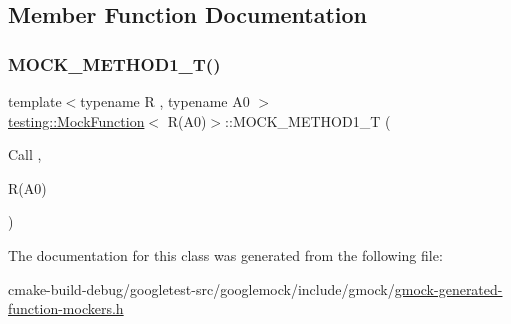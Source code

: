 \subsection{Member Function Documentation}
\mbox{\label{classtesting_1_1MockFunction_3_01R_07A0_08_4_a6a22e7e14b53d2df30bef4404b41fade}} 
\subsubsection{\texorpdfstring{MOCK\_METHOD1\_T()}{MOCK\_METHOD1\_T()}}
{\footnotesize\ttfamily template$<$typename R , typename A0 $>$ \\
\mbox{\hyperlink{classtesting_1_1MockFunction}{testing\+::\+Mock\+Function}}$<$ R(A0)$>$\+::M\+O\+C\+K\+\_\+\+M\+E\+T\+H\+O\+D1\+\_\+T (\begin{DoxyParamCaption}\item[{Call}]{,  }\item[{R(A0)}]{ }\end{DoxyParamCaption})}



The documentation for this class was generated from the following file\+:\begin{DoxyCompactItemize}
\item 
cmake-\/build-\/debug/googletest-\/src/googlemock/include/gmock/\mbox{\hyperlink{gmock-generated-function-mockers_8h}{gmock-\/generated-\/function-\/mockers.\+h}}\end{DoxyCompactItemize}
